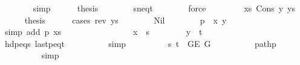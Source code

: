 \begin{isabellebody}
\ \ \ \ \ \ \isamarkupfalse%
\ simp{\isacharplus}{\kern0pt}\isanewline
\ \ \ \ \isamarkupfalse%
\ {\isacharquery}{\kern0pt}thesis\isanewline
\ \ \ \ \ \ \isamarkupfalse%
\ s{\isacharunderscore}{\kern0pt}neq{\isacharunderscore}{\kern0pt}t\isanewline
\ \ \ \ \ \ \isamarkupfalse%
\ force\isanewline
\ \ \isamarkupfalse%
\isanewline
\ \ \ \ \isamarkupfalse%
\ xs{\isacharcolon}{\kern0pt}\ {\isacharparenleft}{\kern0pt}Cons\ y\ ys{\isacharparenright}{\kern0pt}\isanewline
\ \ \ \ \isamarkupfalse%
\ {\isacharquery}{\kern0pt}thesis\isanewline
\ \ \ \ \isamarkupfalse%
\ {\isacharparenleft}{\kern0pt}cases\ {\isachardoublequoteopen}rev\ ys{\isachardoublequoteclose}{\isacharparenright}{\kern0pt}\isanewline
\ \ \ \ \ \ \isamarkupfalse%
\ Nil\isanewline
\ \ \ \ \ \ \isamarkupfalse%
\ {\isachardoublequoteopen}{\isacharquery}{\kern0pt}p\ {\isacharequal}{\kern0pt}\ {\isacharbrackleft}{\kern0pt}x{\isacharcomma}{\kern0pt}\ y{\isacharbrackright}{\kern0pt}{\isachardoublequoteclose}\isanewline
\ \ \ \ \ \ \ \ \isamarkupfalse%
\ {\isacharparenleft}{\kern0pt}simp\ add{\isacharcolon}{\kern0pt}\ p\ xs{\isacharparenright}{\kern0pt}\isanewline
\ \ \ \ \ \ \isamarkupfalse%
\ \isamarkupfalse%
\isanewline
\ \ \ \ \ \ \ \ {\isachardoublequoteopen}x\ {\isacharequal}{\kern0pt}\ s{\isachardoublequoteclose}\isanewline
\ \ \ \ \ \ \ \ {\isachardoublequoteopen}y\ {\isacharequal}{\kern0pt}\ t{\isachardoublequoteclose}\isanewline
\ \ \ \ \ \ \ \ \isamarkupfalse%
\ hd{\isacharunderscore}{\kern0pt}p{\isacharunderscore}{\kern0pt}eq{\isacharunderscore}{\kern0pt}s\ last{\isacharunderscore}{\kern0pt}p{\isacharunderscore}{\kern0pt}eq{\isacharunderscore}{\kern0pt}t\isanewline
\ \ \ \ \ \ \ \ \isamarkupfalse%
\ simp{\isacharplus}{\kern0pt}\isanewline
\ \ \ \ \ \ \isamarkupfalse%
\ \isamarkupfalse%
\ {\isachardoublequoteopen}{\isacharbraceleft}{\kern0pt}s{\isacharcomma}{\kern0pt}\ t{\isacharbraceright}{\kern0pt}\ {\isasymin}\ {\isacharparenleft}{\kern0pt}G{\isachardot}{\kern0pt}E\ {\isacharquery}{\kern0pt}G{\isacharparenright}{\kern0pt}{\isachardoublequoteclose}\isanewline
\ \ \ \ \ \ \ \ \isamarkupfalse%
\ path{\isacharunderscore}{\kern0pt}p\isanewline
\ \ \ \ \ \ \ \ \isamarkupfalse%
\ simp\isanewline
\ \ \ \ \ \ \isamarkupfalse%
\ \isamarkupfalse%

\end{isabellebody}
